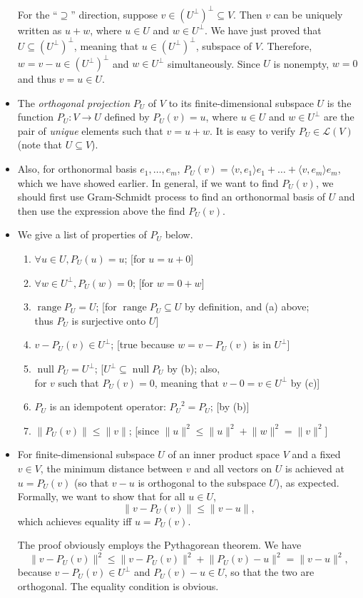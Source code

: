 \documentclass[11pt]{article}
\newcommand{\df}[1]{\textit{\textsf{#1}}}
\newcommand{\n}{\operatorname{null}}
\renewcommand{\r}{\operatorname{range}}
\newcommand{\inp}[2]{\langle #1, #2 \rangle}
\newcommand{\nm}[1]{\lVert #1 \rVert}
\newcommand{\LV}{\mathcal{L}(V)}
\begin{document}
\begin{itemize}
    For the ``$\supseteq$'' direction, suppose $v \in (U^\perp)^\perp \subseteq V$. Then $v$ can be uniquely written as $u+w$, where $u \in U$ and $w \in U^\perp$. We have just proved that $U \subseteq (U^\perp)^\perp$, meaning that $u \in (U^\perp)^\perp$, subspace of $V$. Therefore, $w = v-u \in (U^\perp)^\perp$ and $w \in U^\perp$ simultaneously. Since $U$ is nonempty, $w = 0$ and thus $v = u \in U$.
    \item The \df{orthogonal projection} $P_U$ of $V$ to its finite-dimensional subspace $U$ is the function $P_U: V \to U$ defined by $P_U(v) = u$, where $u \in U$ and $w \in U^\perp$ are the pair of \emph{unique} elements such that $v = u+w$. It is easy to verify $P_U \in \LV$ (note that $U \subseteq V$).
    \item Also, for orthonormal basis $e_1,\dots,e_m$, $P_U(v) = \inp{v}{e_1}e_1+\dots+\inp{v}{e_m}e_m$, which we have showed earlier. In general, if we want to find $P_U(v)$, we should first use Gram-Schmidt process to find an orthonormal basis of $U$ and then use the expression above the find $P_U(v)$.
    \item We give a list of properties of $P_U$ below.
    \begin{enumerate}[label=(\alph*)]
        \item $\forall u \in U, P_U(u) = u$; [for $u = u+0$]
        \item $\forall w \in U^\perp, P_U(w) = 0$; [for $w = 0+w$]
        \item $\r P_U = U$; [for $\r P_U \subseteq U$ by definition, and (a) above; \\ thus $P_U$ is surjective onto $U$]
        \item $v - P_U(v) \in U^\perp$; [true because $w = v - P_U(v)$ is in $U^\perp$]
        \item $\n P_U = U^\perp$; [$U^\perp \subseteq \n P_U$ by (b); also, \\ for $v$ such that $P_U(v) = 0$, meaning that $v - 0 = v \in U^\perp$ by (c)]
        \item $P_U$ is an idempotent operator: ${P_U}^2 = P_U$; [by (b)]
        \item $\nm{P_U(v)} \leq \nm{v}$; [since $\nm{u}^2 \leq \nm{u}^2 + \nm{w}^2 = \nm{v}^2$]
    \end{enumerate}
    \item For finite-dimensional subspace $U$ of an inner product space $V$ and a fixed $v \in V$, the minimum distance between $v$ and all vectors on $U$ is achieved at $u = P_U(v)$ (so that $v - u$ is orthogonal to the subspace $U$), as expected. Formally, we want to show that for all $u \in U$, $$\nm{v - P_U(v)} \leq \nm{v-u},$$ which achieves equality iff $u = P_U(v)$.
    
    The proof obviously employs the Pythagorean theorem. We have
    \begin{equation*}
        \nm{v - P_U(v)}^2 \leq \nm{v - P_U(v)}^2+\nm{P_U(v) - u}^2 = \nm{v - u}^2,
    \end{equation*}
    because $v - P_U(v) \in U^\perp$ and $P_U(v) - u \in U$, so that the two are orthogonal. The equality condition is obvious.
\end{itemize}
\end{document}
